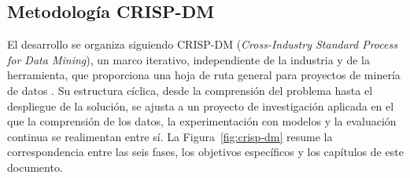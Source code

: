 \subsection{Metodología CRISP-DM}

El desarrollo se organiza siguiendo CRISP-DM (\textit{Cross-Industry Standard
    Process for Data Mining}), un marco iterativo, independiente de la industria y
de la herramienta, que proporciona una hoja de ruta general para proyectos de
minería de datos \citep{chapman_crisp-dm_2000}. Su estructura cíclica, desde la
comprensión del problema hasta el despliegue de la solución, se ajusta a un proyecto
de investigación aplicada en el que la comprensión de los datos, la
experimentación con modelos y la evaluación continua se realimentan entre sí.
La Figura~\ref{fig:crisp-dm} resume la correspondencia entre las seis fases, los
objetivos específicos y los capítulos de este documento.

